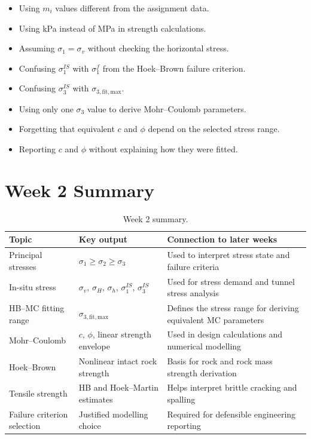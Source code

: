 \documentclass[a4paper,12pt]{article}
\begin{document}
\begin{errbox}
\begin{itemize}
    \item Using \(m_i\) values different from the assignment data.
    \item Using kPa instead of MPa in strength calculations.
    \item Assuming \(\sigma_1=\sigma_v\) without checking the horizontal stress.
    \item Confusing \(\sigma_1^{IS}\) with \(\sigma_1^f\) from the Hoek--Brown failure criterion.
    \item Confusing \(\sigma_3^{IS}\) with \(\sigma_{3,\mathrm{fit,max}}\).
    \item Using only one \(\sigma_3\) value to derive Mohr--Coulomb parameters.
    \item Forgetting that equivalent \(c\) and \(\phi\) depend on the selected stress range.
    \item Reporting \(c\) and \(\phi\) without explaining how they were fitted.
\end{itemize}
\end{errbox}

\section{Week 2 Summary}

\begin{table}[H]
\centering
\small
\begin{tabularx}{\textwidth}{l Y Y}
\toprule
\textbf{Topic} & \textbf{Key output} & \textbf{Connection to later weeks} \\
\midrule
Principal stresses & \(\sigma_1 \geq \sigma_2 \geq \sigma_3\) & Used to interpret stress state and failure criteria \\
In-situ stress & \(\sigma_v\), \(\sigma_H\), \(\sigma_h\), \(\sigma_1^{IS}\), \(\sigma_3^{IS}\) & Used for stress demand and tunnel stress analysis \\
HB--MC fitting range & \(\sigma_{3,\mathrm{fit,max}}\) & Defines the stress range for deriving equivalent MC parameters \\
Mohr--Coulomb & \(c\), \(\phi\), linear strength envelope & Used in design calculations and numerical modelling \\
Hoek--Brown & Nonlinear intact rock strength & Basis for rock and rock mass strength derivation \\
Tensile strength & HB and Hoek--Martin estimates & Helps interpret brittle cracking and spalling \\
Failure criterion selection & Justified modelling choice & Required for defensible engineering reporting \\
\bottomrule
\end{tabularx}
\caption{Week 2 summary.}
\end{table}
\end{document}
